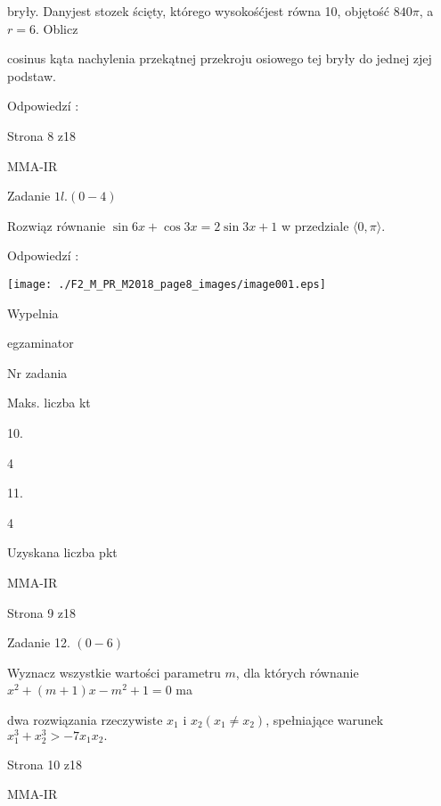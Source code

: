\documentclass[a4paper,12pt]{article}
\begin{document}
bryły. Danyjest stozek ścięty, którego wysokośćjest równa 10, objętość $ 840\pi$, a $r=6$. Oblicz

cosinus kąta nachylenia przekątnej przekroju osiowego tej bryły do jednej zjej podstaw.

Odpowiedzí :

Strona 8 z18

MMA-IR





Zadanie $1l. (0-4)$

Rozwiąz równanie $\sin 6x+\cos 3x=2\sin 3x+1$ w przedziale $\langle 0, \pi\rangle.$

Odpowiedzí :
\begin{center}
\texttt{[image: ./F2\_M\_PR\_M2018\_page8\_images/image001.eps]}
\end{center}
Wypelnia

egzaminator

Nr zadania

Maks. liczba kt

10.

4

11.

4

Uzyskana liczba pkt

MMA-IR

Strona 9 z18





Zadanie 12. $(0-6)$

Wyznacz wszystkie wartości parametru $m$, dla których równanie $x^{2}+(m+1)x-m^{2}+1=0$ ma

dwa rozwiązania rzeczywiste $x_{1}$ i $x_{2}(x_{1}\neq x_{2})$, spełniające warunek $x_{1}^{3}+x_{2}^{3}>-7x_{1}x_{2}.$

Strona 10 z18

MMA-IR
\end{document}
